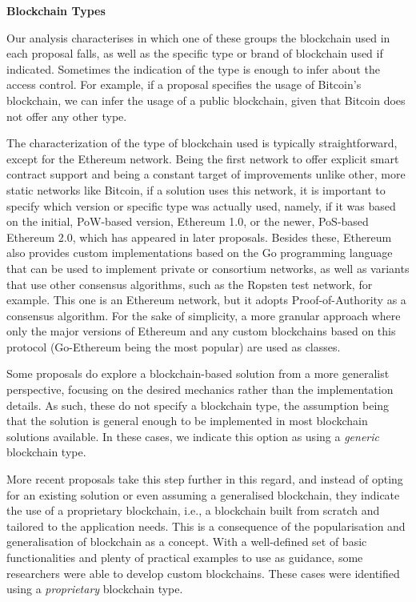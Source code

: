 \documentclass[../access.tex]{subfiles}
\begin{document}
\par
\textbf{Blockchain Types}
\par
Our analysis characterises in which one of these groups the blockchain used in each proposal falls, as well as the specific type or brand of blockchain used if indicated. Sometimes the indication of the type is enough to infer about the access control. For example, if a proposal specifies the usage of Bitcoin's blockchain, we can infer the usage of a public blockchain, given that Bitcoin does not offer any other type.
\par
The characterization of the type of blockchain used is typically straightforward, except for the Ethereum network. Being the first network to offer explicit smart contract support and being a constant target of improvements unlike other, more static networks like Bitcoin, if a solution uses this network, it is important to specify which version or specific type was actually used, namely, if it was based on the initial, PoW-based version, Ethereum 1.0, or the newer, PoS-based Ethereum 2.0, which has appeared in later proposals. Besides these, Ethereum also provides custom implementations based on the Go programming language that can be used to implement private or consortium networks, as well as variants that use other consensus algorithms, such as the Ropsten test network, for example. This one is an Ethereum network, but it adopts Proof-of-Authority as a consensus algorithm. For the sake of simplicity, a more granular approach where only the major versions of Ethereum and any custom blockchains based on this protocol (Go-Ethereum being the most popular) are used as classes.
\par
Some proposals do explore a blockchain-based solution from a more generalist perspective, focusing on the desired mechanics rather than the implementation details. As such, these do not specify a blockchain type, the assumption being that the solution is general enough to be implemented in most blockchain solutions available. In these cases, we indicate this option as using a \textit{generic} blockchain type.
\par
More recent proposals take this step further in this regard, and instead of opting for an existing solution or even assuming a generalised blockchain, they indicate the use of a proprietary blockchain, i.e., a blockchain built from scratch and tailored to the application needs. This is a consequence of the popularisation and generalisation of blockchain as a concept. With a well-defined set of basic functionalities and plenty of practical examples to use as guidance, some researchers were able to develop custom blockchains. These cases were identified using a \textit{proprietary} blockchain type.
\end{document}
